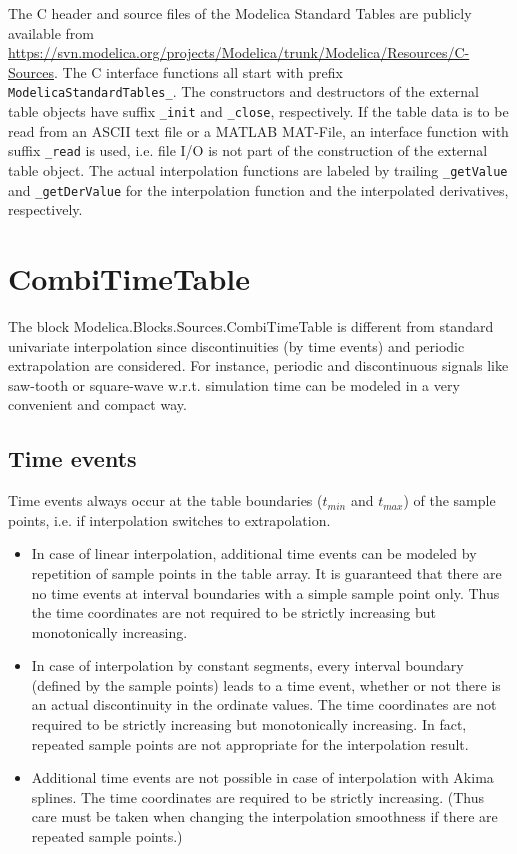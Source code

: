 \documentclass[11pt,a4paper,twocolumn]{article}
\begin{document}
The C header and source files of the Mod\-el\-ica Standard Tables are publicly available from \url{https://svn.modelica.org/projects/Modelica/trunk/Modelica/Resources/C-Sources}. The C interface functions all start with prefix \texttt{Mod\-el\-ica\-Standard\-Tables\_}. The constructors and destructors of the external table objects have suffix \texttt{\_init} and \texttt{\_close}, respectively. If the table data is to be read from an ASCII text file or a MATLAB MAT-File, an inter\-face function with suffix \texttt{\_read} is used, i.e. file I/O is not part of the construction of the external table object. The actual interpolation functions are labeled by trailing \texttt{\_getValue} and \texttt{\_getDerValue} for the interpolation function and the interpolated derivatives, respectively.

\section{CombiTimeTable}
The block Mod\-el\-ica.Blocks.Sources.Combi\-Time\-Ta\-ble is different from standard univariate interpolation since discontinuities (by time events) and periodic ex\-trapo\-la\-tion are considered. For instance, periodic and discontinuous signals like saw-tooth or square-wave w.r.t. simulation time can be modeled in a very convenient and compact way.

\subsection{Time events}
Time events always occur at the table boundaries ($t_{min}$ and $t_{max}$) of the sample points, i.e. if interpolation switches to extrapolation.
\begin{itemize}
\item In case of linear interpolation, additional time events can be modeled by repetition of sample points in the table array. It is guaranteed that there are no time events at interval boundaries with a simple sample point only. Thus the time coordinates are not required to be strictly increasing but monotonically increasing.
\item In case of interpolation by constant segments, every interval boundary (defined by the sample points) leads to a time event, whether or not there is an actual discontinuity in the ordinate values. The time coordinates are not required to be strictly increasing but monotonically increasing. In fact, repeated sample points are not appropriate for the interpolation result.
\item Additional time events are not possible in case of interpolation with Akima splines. The time coordinates are required to be strictly increasing. (Thus care must be taken when changing the interpolation smoothness if there are repeated sample points.)
\end{itemize}
\end{document}

